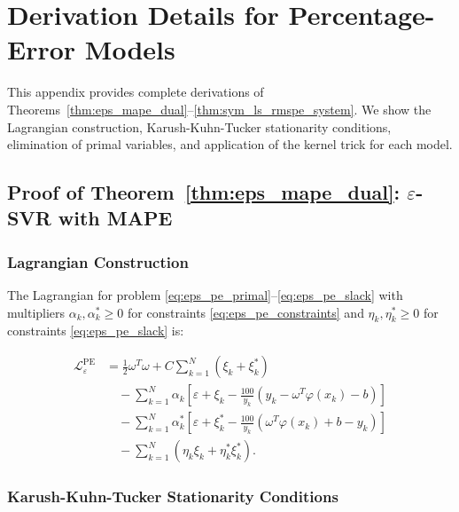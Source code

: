 \documentclass[mathematics,article,submit,pdftex,moreauthors]{Definitions/mdpi}
\begin{document}
\section{Derivation Details for Percentage-Error Models}
\label{app:derivations}

This appendix provides complete derivations of Theorems~\ref{thm:eps_mape_dual}--\ref{thm:sym_ls_rmspe_system}. 
We show the Lagrangian construction, Karush-Kuhn-Tucker stationarity conditions, elimination of primal variables, 
and application of the kernel trick for each model.


\subsection{Proof of Theorem~\ref{thm:eps_mape_dual}: $\varepsilon$-SVR with MAPE}
\label{app:proof_eps_mape}

\subsubsection{Lagrangian Construction}

The Lagrangian for problem \eqref{eq:eps_pe_primal}--\eqref{eq:eps_pe_slack} 
with multipliers $\alpha_k, \alpha_k^* \geq 0$ for constraints \eqref{eq:eps_pe_constraints} 
and $\eta_k, \eta_k^* \geq 0$ for constraints \eqref{eq:eps_pe_slack} is:
\begin{linenomath}
\begin{equation}\label{eq:lagrangian_eps_mape_full}
\begin{aligned}
\mathcal{L}_{\varepsilon}^{\mathrm{PE}} 
&= \frac{1}{2}\omega^T\omega + C\sum_{k=1}^N (\xi_k + \xi_k^*)\\
&\quad - \sum_{k=1}^N \alpha_k\left[\varepsilon + \xi_k - \frac{100}{y_k}(y_k - \omega^T\varphi(x_k) - b)\right]\\
&\quad - \sum_{k=1}^N \alpha_k^*\left[\varepsilon + \xi_k^* - \frac{100}{y_k}(\omega^T\varphi(x_k) + b - y_k)\right]\\
&\quad - \sum_{k=1}^N (\eta_k\xi_k + \eta_k^*\xi_k^*).
\end{aligned}
\end{equation}
\end{linenomath}

\subsubsection{Karush-Kuhn-Tucker Stationarity Conditions}
\end{document}
